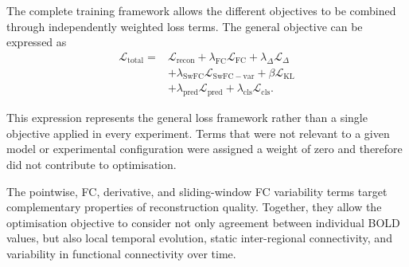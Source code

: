 The complete training framework allows the different objectives to be
combined through independently weighted loss terms. The general objective
can be expressed as
\begin{equation}
\begin{split}
    \mathcal{L}_{\mathrm{total}}
    ={}&
    \mathcal{L}_{\mathrm{recon}}
    + \lambda_{\mathrm{FC}}\mathcal{L}_{\mathrm{FC}}
    + \lambda_{\Delta}\mathcal{L}_{\Delta} \\
    &+
    \lambda_{\mathrm{SwFC}}
    \mathcal{L}_{\mathrm{SwFC-var}}
    + \beta\mathcal{L}_{\mathrm{KL}} \\
    &+
    \lambda_{\mathrm{pred}}\mathcal{L}_{\mathrm{pred}}
    + \lambda_{\mathrm{cls}}\mathcal{L}_{\mathrm{cls}} .
\end{split}
\end{equation}

This expression represents the general loss framework rather than a single
objective applied in every experiment. Terms that were not relevant to a
given model or experimental configuration were assigned a weight of zero
and therefore did not contribute to optimisation.

The pointwise, FC, derivative, and sliding-window FC variability terms
target complementary properties of reconstruction quality. Together, they
allow the optimisation objective to consider not only agreement between
individual BOLD values, but also local temporal evolution, static
inter-regional connectivity, and variability in functional connectivity
over time.